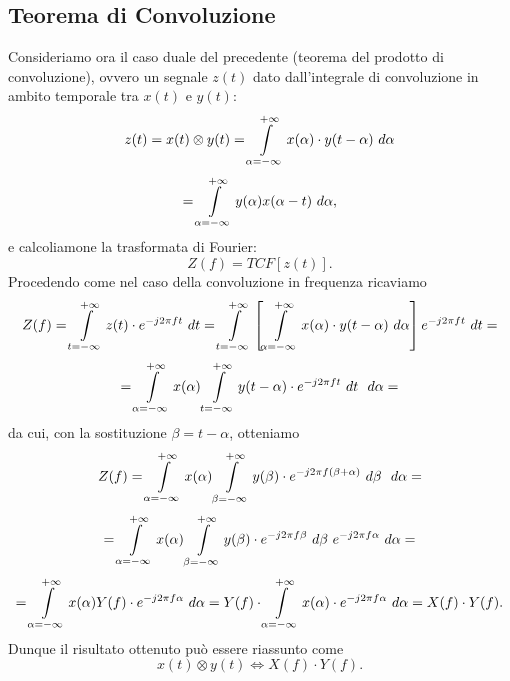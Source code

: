 \documentclass[12pt,oneside,openany]{memoir}
\numberwithin{equation}{subsection}
\newcommand{\dt}{\ dt}
\begin{document}
\subsection{Teorema di Convoluzione}
Consideriamo ora il caso duale del precedente (teorema del prodotto di 
convoluzione), ovvero un segnale $z(t)$ dato dall'integrale di convoluzione in
ambito temporale tra $x(t)$ e $y(t)$:
\[
    z(t) = x(t) \otimes y(t) = \int\displaylimits_{\alpha = -\infty}^{+\infty}
    x(\alpha) \cdot y(t - \alpha) \ d \alpha
\]
\[
    = \int\displaylimits_{\alpha = -\infty}^{+\infty} y(\alpha) x(\alpha - t)
    \ d \alpha,
\]
e calcoliamone la trasformata di Fourier:
\[
    Z(f) = TCF\left[z(t)\right].
\]
Procedendo come nel caso della convoluzione in frequenza ricaviamo
\[
    Z(f) = \int\displaylimits_{t = -\infty}^{+\infty} z(t) \cdot
    e^{-j 2 \pi f t} \dt = \int\displaylimits_{t = -\infty}^{+\infty} \left[
        \int\displaylimits_{\alpha = -\infty}^{+\infty} x(\alpha) \cdot
        y(t - \alpha) \ d \alpha
    \right] e^{-j 2 \pi f t} \dt =
\]
\[
    = \int\displaylimits_{\alpha = -\infty}^{+\infty} x(\alpha)
    \int\displaylimits_{t = -\infty}^{+\infty} y(t - \alpha) \cdot
    e^{-j 2 \pi f t} \dt \ \ d \alpha =
\]
da cui, con la sostituzione $\beta = t - \alpha$, otteniamo
\[
    Z(f) = \int\displaylimits_{\alpha = -\infty}^{+\infty} x(\alpha)
    \int\displaylimits_{\beta = -\infty}^{+\infty} y(\beta) \cdot
    e^{-j 2 \pi f (\beta + \alpha)} \ d \beta \ \ d \alpha =
\]
\[
    = \int\displaylimits_{\alpha = -\infty}^{+\infty} x(\alpha)
    \int\displaylimits_{\beta = -\infty}^{+\infty} y(\beta) \cdot
    e^{-j 2 \pi f \beta} \ d \beta \ e^{-j 2 \pi f \alpha} \ d \alpha =
\]
\[
    = \int\displaylimits_{\alpha = -\infty}^{+\infty} x(\alpha) Y(f) \cdot
    e^{-j 2 \pi f \alpha} \ d \alpha = Y(f) \cdot
    \int\displaylimits_{\alpha = -\infty}^{+\infty} x(\alpha) \cdot
    e^{-j 2 \pi f \alpha} \ d \alpha = X(f) \cdot Y(f).
\]
Dunque il risultato ottenuto pu\`o essere riassunto come
\[
    x(t) \otimes y(t) \iff X(f) \cdot Y(f).
\]

\end{document}
